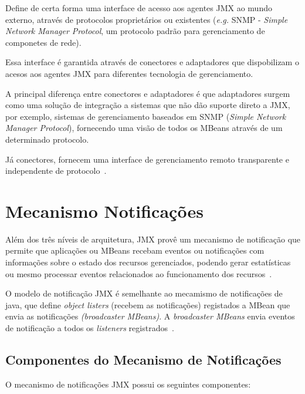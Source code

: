 Define de certa forma uma interface de acesso aos agentes JMX ao mundo externo, através de protocolos proprietários ou existentes (\textit{e.g.} SNMP - \textit{Simple Network Manager Protocol}, um protocolo padrão para gerenciamento de componetes de rede).

Essa interface é garantida através de conectores e adaptadores que dispobilizam o acesos aos agentes JMX para diferentes tecnologia de gerenciamento.

A principal diferença entre conectores e adaptadores é que adaptadores surgem como uma solução de integração a sistemas que não dão suporte direto a JMX, por exemplo, sistemas de gerenciamento baseados em SNMP (\textit{Simple Network Manager Protocol}), fornecendo uma visão de todos os MBeans através de um determinado protocolo. 

Já conectores, fornecem uma interface de gerenciamento remoto transparente e independente de protocolo~\cite{jmx}.

\section{Mecanismo Notificações}
Além dos três níveis de arquitetura, JMX provê um mecanismo de notificação que permite que aplicações ou MBeans recebam eventos ou notificações com informações sobre o estado dos recursos gerenciados, podendo gerar estatísticas ou mesmo processar eventos relacionados ao funcionamento dos recursos~\cite{lindfors2002jmx}.

O modelo de notificação JMX é semelhante ao mecamismo de notificações de java, que define \textit{object listers} (recebem as notificações) registados a MBean que envia as notificações \textit{(broadcaster MBeans)}. A \textit{broadcaster MBeans} envia eventos de notificação a todos os \textit{listeners} registrados~\cite{lindfors2002jmx}.

\subsection{Componentes do Mecanismo de Notificações}

O mecanismo de notificações JMX possui os seguintes componentes:

